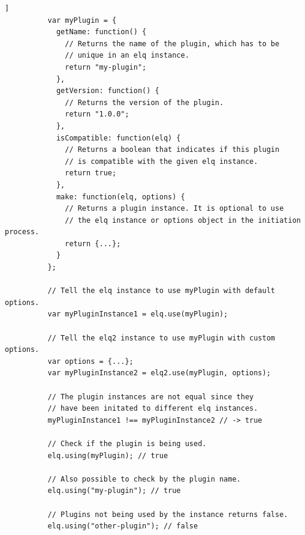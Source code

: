 \documentclass[a4paper,11pt]{kth-mag}
\begin{document}
        \begin{lstlisting}[gobble=10,caption={Plugin object definition and examples of handling plugins.},captionpos=b,label={code:plugin-object}]]
          var myPlugin = {
            getName: function() {
              // Returns the name of the plugin, which has to be 
              // unique in an elq instance.
              return "my-plugin";
            },
            getVersion: function() {
              // Returns the version of the plugin.
              return "1.0.0";
            },
            isCompatible: function(elq) {
              // Returns a boolean that indicates if this plugin
              // is compatible with the given elq instance.
              return true;
            },
            make: function(elq, options) {
              // Returns a plugin instance. It is optional to use
              // the elq instance or options object in the initiation process.
              return {...};
            }
          };

          // Tell the elq instance to use myPlugin with default options.
          var myPluginInstance1 = elq.use(myPlugin);

          // Tell the elq2 instance to use myPlugin with custom options.
          var options = {...};
          var myPluginInstance2 = elq2.use(myPlugin, options);

          // The plugin instances are not equal since they 
          // have been initated to different elq instances.
          myPluginInstance1 !== myPluginInstance2 // -> true

          // Check if the plugin is being used.
          elq.using(myPlugin); // true

          // Also possible to check by the plugin name.
          elq.using("my-plugin"); // true

          // Plugins not being used by the instance returns false.
          elq.using("other-plugin"); // false
        \end{lstlisting}
\end{document}
